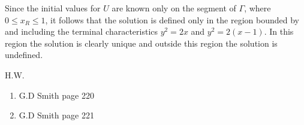 \documentclass[../main-sheet.tex]{subfiles}
\begin{document}
\begin{note}
    Since the initial values for \(U\) are known only on the segment of \(\Gamma\), where \(0\leq x_R\leq 1\), it follows that the solution is defined only in the region bounded by and including the terminal characteristics \(y^2=2x\) and \(y^2=2(x-1)\). In this region the solution is clearly unique and outside this region the solution is undefined.
\end{note}
H.W.
\begin{enumerate}
    \item G.D Smith page 220
    \item G.D Smith page 221
\end{enumerate}
\end{document}
